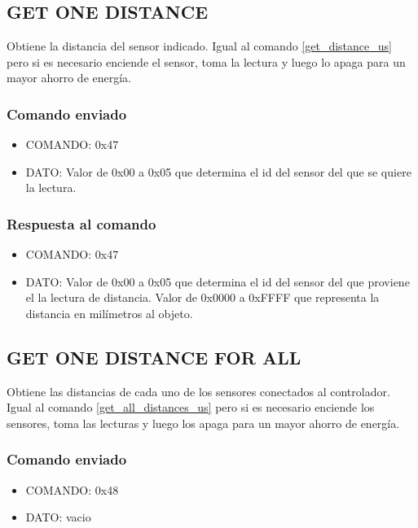 \documentclass[a4paper,10pt]{article}
\begin{document}
\subsection{GET ONE DISTANCE}
\label{get_one_distance_us}

Obtiene la distancia del sensor indicado.
Igual al comando \ref{get_distance_us} pero si es necesario enciende el sensor, toma la lectura y luego lo apaga para un mayor ahorro de energ\'ia.

\subsubsection*{Comando enviado}

\begin{itemize}
	\item{COMANDO:} 0x47
	\item{DATO:} Valor de 0x00 a 0x05 que determina el id del sensor del que se quiere la lectura.
\end{itemize}

\subsubsection*{Respuesta al comando}

\begin{itemize}
	\item{COMANDO:} 0x47
	\item{DATO:} Valor de 0x00 a 0x05 que determina el id del sensor del que proviene el la lectura de distancia.
	Valor de 0x0000 a 0xFFFF que representa la distancia en mil\'imetros al objeto.
\end{itemize}

\subsection{GET ONE DISTANCE FOR ALL}
\label{get_one_distance_for_all_us}

Obtiene las distancias de cada uno de los sensores conectados al controlador.
Igual al comando \ref{get_all_distances_us} pero si es necesario enciende los sensores, toma las lecturas y luego los apaga para un mayor ahorro de energ\'ia.

\subsubsection*{Comando enviado}

\begin{itemize}
	\item{COMANDO:} 0x48
	\item{DATO:} vacio
\end{itemize}
\end{document}
